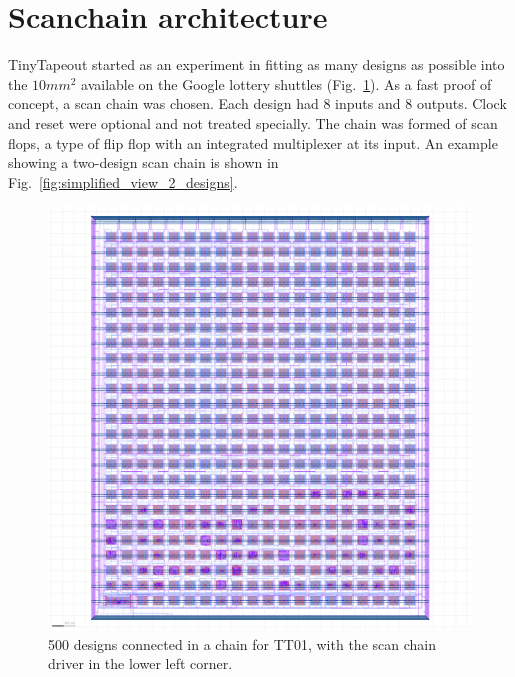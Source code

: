 \section{Scanchain architecture}
\label{sec:scanchain_arch}

TinyTapeout started as an experiment in fitting as many designs as possible into the \(10 mm^2\) available on the Google lottery shuttles (Fig.~\ref{fig:500_designs_chain_TT01}).
As a fast proof of concept, a scan chain was chosen.
Each design had 8 inputs and 8 outputs.
Clock and reset were optional and not treated specially. The chain was formed of scan flops\cite{skywaterpdk}, a type of flip flop with an integrated multiplexer at its input. An example showing a two-design scan chain is shown in Fig.~\ref{fig:simplified_view_2_designs}.

\begin{figure}[htp]
\centering
\includegraphics[width=1\columnwidth]{./Figs/tt01_whole_die.png}
\caption{500 designs connected in a chain for TT01, with the scan chain driver in the lower left corner.}
\label{fig:500_designs_chain_TT01}
\end{figure}

